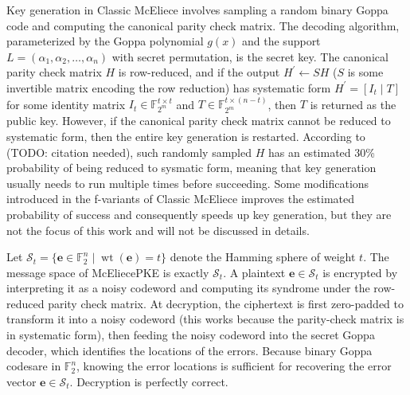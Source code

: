 \documentclass[runningheads]{llncs}
\newcommand{\wt}{\mathop{wt}}
\begin{document}
Key generation in Classic McEliece involves sampling a random binary Goppa code and computing the canonical parity check matrix. The decoding algorithm, parameterized by the Goppa polynomial $g(x)$ and the support $L = (\alpha_1, \alpha_2, \ldots, \alpha_n)$ with secret permutation, is the secret key. The canonical parity check matrix $H$ is row-reduced, and if the output $H^\prime \leftarrow SH$ ($S$ is some invertible matrix encoding the row reduction) has systematic form $H^\prime = [I_t \mid T]$ for some identity matrix $I_t \in \mathbb{F}_{2^m}^{t \times t}$ and $T \in \mathbb{F}_{2^m}^{t \times (n - t)}$, then $T$ is returned as the public key. However, if the canonical parity check matrix cannot be reduced to systematic form, then the entire key generation is restarted. According to (TODO: citation needed), such randomly sampled $H$ has an estimated 30\% probability of being reduced to sysmatic form, meaning that key generation usually needs to run multiple times before succeeding. Some modifications introduced in the f-variants of Classic McEliece improves the estimated probability of success and consequently speeds up key generation, but they are not the focus of this work and will not be discussed in details.

Let $\mathcal{S}_t = \{\mathbf{e} \in \mathbb{F}_2^n \mid \wt(\mathbf{e}) = t\}$ denote the Hamming sphere of weight $t$. The message space of McEliecePKE is exactly $\mathcal{S}_t$. A plaintext $\mathbf{e}\in\mathcal{S}_t$ is encrypted by interpreting it as a noisy codeword and computing its syndrome under the row-reduced parity check matrix. At decryption, the ciphertext is first zero-padded to transform it into a noisy codeword (this works because the parity-check matrix is in systematic form), then feeding the noisy codeword into the secret Goppa decoder, which identifies the locations of the errors. Because binary Goppa codesare in $\mathbb{F}_2^n$, knowing the error locations is sufficient for recovering the error vector $\mathbf{e}\in\mathcal{S}_t$. Decryption is perfectly correct.
\end{document}
